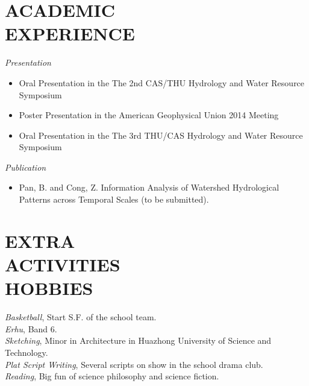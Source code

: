 \documentclass[margin]{res}
\begin{document}
\begin{resume}
\begin{itemize}
                 \end{itemize} 
                 \section{ACADEMIC\\EXPERIENCE}  
 {\it Presentation\\} 
 \begin{itemize}
 \item Oral Presentation in the The 2nd CAS/THU Hydrology and Water Resource Symposium
 \item Poster Presentation in the American Geophysical Union 2014 Meeting
 \item Oral Presentation in the The 3rd THU/CAS Hydrology and Water Resource Symposium
 \end{itemize}
  {\it Publication\\} 
  \begin{itemize}
  \item Pan, B. and Cong, Z.  Information Analysis of Watershed Hydrological Patterns across Temporal Scales (to be submitted). 
  \end{itemize}
 

\section{EXTRA \\ ACTIVITIES\\HOBBIES}             

            {\it Basketball}, Start S.F. of the school team. \\
            {\it Erhu}, Band 6.\\
            {\it Sketching}, Minor in Architecture in Huazhong University of Science and Technology. \\
            {\it Plat Script Writing}, Several scripts on show in the school drama club. \\
            {\it Reading}, Big fun of science philosophy and science fiction. 
 

\end{resume}
\end{document}
